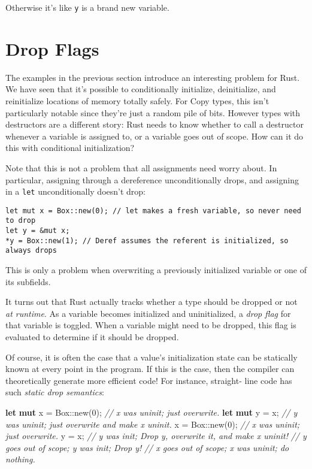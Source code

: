\documentclass[a4paper,]{book}
\newenvironment{Shaded}{\begin{snugshade}}{\end{snugshade}}
\newcommand{\KeywordTok}[1]{\textcolor[rgb]{0.13,0.29,0.53}{\textbf{{#1}}}}
\newcommand{\DecValTok}[1]{\textcolor[rgb]{0.00,0.00,0.81}{{#1}}}
\newcommand{\CommentTok}[1]{\textcolor[rgb]{0.56,0.35,0.01}{\textit{{#1}}}}
\newcommand{\NormalTok}[1]{{#1}}
\begin{document}
Otherwise it's like \texttt{y} is a brand new variable.

\section{Drop Flags}\label{sec--drop-flags}

The examples in the previous section introduce an interesting problem
for Rust. We have seen that it's possible to conditionally initialize,
deinitialize, and reinitialize locations of memory totally safely. For
Copy types, this isn't particularly notable since they're just a random
pile of bits. However types with destructors are a different story: Rust
needs to know whether to call a destructor whenever a variable is
assigned to, or a variable goes out of scope. How can it do this with
conditional initialization?

Note that this is not a problem that all assignments need worry about.
In particular, assigning through a dereference unconditionally drops,
and assigning in a \texttt{let} unconditionally doesn't drop:

\begin{verbatim}
let mut x = Box::new(0); // let makes a fresh variable, so never need to drop
let y = &mut x;
*y = Box::new(1); // Deref assumes the referent is initialized, so always drops
\end{verbatim}

This is only a problem when overwriting a previously initialized
variable or one of its subfields.

It turns out that Rust actually tracks whether a type should be dropped
or not \emph{at runtime}. As a variable becomes initialized and
uninitialized, a \emph{drop flag} for that variable is toggled. When a
variable might need to be dropped, this flag is evaluated to determine
if it should be dropped.

Of course, it is often the case that a value's initialization state can
be statically known at every point in the program. If this is the case,
then the compiler can theoretically generate more efficient code! For
instance, straight- line code has such \emph{static drop semantics}:

\begin{Shaded}
\begin{Highlighting}[]
\KeywordTok{let} \KeywordTok{mut} \NormalTok{x = Box::new(}\DecValTok{0}\NormalTok{); }\CommentTok{// x was uninit; just overwrite.}
\KeywordTok{let} \KeywordTok{mut} \NormalTok{y = x;           }\CommentTok{// y was uninit; just overwrite and make x uninit.}
\NormalTok{x = Box::new(}\DecValTok{0}\NormalTok{);         }\CommentTok{// x was uninit; just overwrite.}
\NormalTok{y = x;                   }\CommentTok{// y was init; Drop y, overwrite it, and make x uninit!}
                         \CommentTok{// y goes out of scope; y was init; Drop y!}
                         \CommentTok{// x goes out of scope; x was uninit; do nothing.}
\end{Highlighting}
\end{Shaded}
\end{document}
